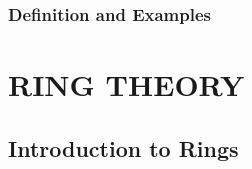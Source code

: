 \documentclass[12pt, oneside]{book}
\begin{document}
\section{Definition and Examples}








\part{RING THEORY}
 
\chapter{Introduction to Rings}

\appendix
\renewcommand{\thechapter}{\Roman{chapter}}


\end{document}
